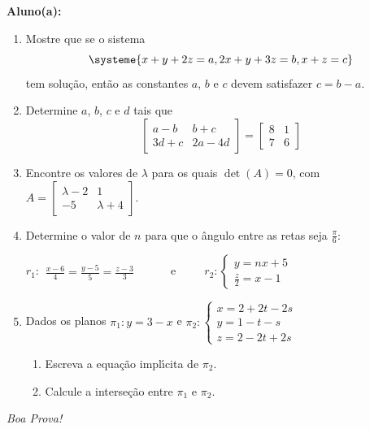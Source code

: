\documentclass[a4paper,5pt]{amsbook}
\newcommand{\ds}{\displaystyle}
\begin{document}
\vspace{0.5cm}
{\bf Aluno(a):}\dotfill{}  %

\vspace{0.2cm}
\begin{enumerate}
	\vspace{0.5cm}
	\item Mostre que se o sistema
		\[\systeme{
				x+y+2z=a,
				2x+y+3z=b,
				x+z=c}\]
	tem solu\c{c}\~ao, ent\~ao as constantes $a$, $b$ e $c$ devem satisfazer $c = b-a$.

	\vspace{0.5cm}
	\item Determine $a$, $b$, $c$ e $d$ tais que
		\[\begin{bmatrix}
			a-b & b+c \\
			3d+c & 2a-4d
		\end{bmatrix}
		=
		\begin{bmatrix}
			8 & 1 \\
			7 & 6
		\end{bmatrix}\]
	
	\vspace{0.5cm}
	\item Encontre os valores de $\lambda$ para os quais $\det(A)=0$, com
		$A=\begin{bmatrix}
			\lambda-2 & 1 \\
			-5 & \lambda+4
		\end{bmatrix}$.

	\vspace{0.5cm}
	\item Determine o valor de $n$ para que o \^angulo entre as retas seja
		$\frac{\pi}{6}$:

	$r_1:\begin{array}{l}
		\ds\frac{x-6}{4} = \frac{y-5}{5} = \frac{z-3}{3}
	\end{array}$
	\ \ \ \ \ e\ \ \ \ \ 
	$r_2:\left\{\begin{array}{l}
		y = nx + 5 \\
		\frac{z}{2} = x - 1
	\end{array}\right.$

	\vspace{0.5cm}
	\item Dados os planos $\pi_1: y=3-x$ e
		$\pi_2: \left\{\begin{array}{l}
			x = 2+2t-2s \\
			y = 1-t-s \\
			z = 2-2t+2s
		\end{array}\right.$
	\begin{enumerate}
		\item Escreva a equa\c{c}\~ao impl\'{\i}cita de $\pi_2$.
		\item Calcule a interse\c{c}\~ao entre $\pi_1$ e $\pi_2$.
	\end{enumerate}

\end{enumerate}

\begin{flushright}
	\vspace{1cm}
	\textit{Boa Prova!}
\end{flushright}
\end{document}
